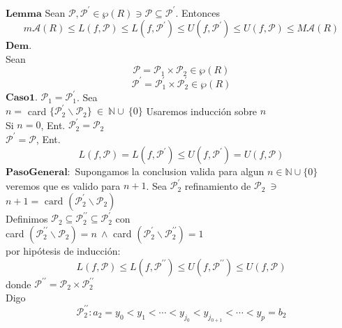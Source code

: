 \documentclass[10pt,a4paper]{article}
\begin{document}
\color{red} 
$\mathbf{Lemma}$
\color{black} 
Sean $\mathcal{P} , \mathcal{P} ^{\prime} \in \wp \left( R \right) \ni \mathcal{P} \subseteq \mathcal{P} ^{\prime} $. Entonces
$$ m \mathcal{A} \left( R \right) \leq L \left( f ,\mathcal{P} \right) \leq L \left( f , \mathcal{P} ^{\prime} \right) 
\leq  U \left( f,\mathcal{P}^{\prime}  \right) \leq U \left( f , \mathcal{P} \right) \leq M \mathcal{A} \left( R \right)    $$
\color{red} 
$\mathbf{Dem.}$ \\
\color{black} 
Sean \\
$$\mathcal{P} = \mathcal{P}_1 \times \mathcal{P}_2 \in \wp \left( R \right)  $$
$$\mathcal{P}^{\prime} = \mathcal{P}_1^{\prime} \times \mathcal{P}_2^{\prime} \in \wp \left( R \right)  $$
\color{red} 
$\mathbf{Caso1.}$
\color{black} 
$\mathcal{P}_1 = \mathcal{P}_1^{\prime}$. Sea  \\ 
$n = $ card $ \{ \mathcal{P}_2^{\prime} \backslash  \mathcal{P}_2  \} \ \in \ \mathbb{N} \cup \ \{ 0 \} $
Usaremos inducción sobre  $n$ \\
Si $n=0$, Ent. $\mathcal{P}_2 ^{\prime}= \mathcal{P}_2 $ \\ 
$ \mathcal{P} ^{\prime} = \mathcal{P} $, Ent. 
$$ L \left( f, \mathcal{P} \right) = L \left( f, \mathcal{P} ^{\prime} \right) \leq  U \left( f, \mathcal{P}^{\prime}  \right) 
= U \left( f, \mathcal{P}  \right) $$
\color{red} 
$\mathbf{Paso General:}$
\color{black} 
Supongamos la conclusion valida para algun $n \in \mathbb{N} \cup \{0 \} $ \\ 
veremos que es valido para $n+1$. Sea $ \mathcal{P}_2 ^{\prime}  $ refinamiento de $\mathcal{P}_2 \ \ni$  \\
$ n+1 = \text{ card } \left( \mathcal{P}_2 ^{\prime} \backslash  \mathcal{P}_2  \right)   $ \\
\newpage
Definimos $\mathcal{P}_2 \subseteq \mathcal{P}_2^{\prime \prime} \subseteq \mathcal{P}_2^{\prime} $
con  \\
card $ \left( \mathcal{P}_2 ^{ \prime \prime }  \backslash \mathcal{P}_2  \right) = n \ \wedge $ 
card $ \left( \mathcal{P}_2 ^{ \prime  }  \backslash \mathcal{P}_2^{\prime \prime}  \right) = 1  $ \\
por hipótesis  de inducción:
$$ L \left( f, \mathcal{P}  \right) \leq L \left( f, \mathcal{P} ^{\prime \prime}   \right) \leq 
U \left( f, \mathcal{P}^{\prime \prime}  \right) \leq U \left( f , \mathcal{P}  \right)   $$
donde $ \mathcal{P}^{\prime \prime} = \mathcal{P}_2  \times  \mathcal{P}_2^{\prime \prime}   $ \\ 
Digo 
$$ \mathcal{P}_2^{\prime \prime} : a_2 = y_0 <y_1< \cdots < y_{j_0} < y_{j_{0+1}} < \cdots < y_p = b_2 $$
\end{document}
